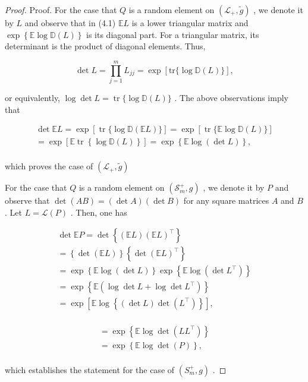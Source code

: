 \documentclass[11pt]{article}
\begin{document}
\begin{proof}
Proof. For the case that  $Q$  is a random element on  $(\mathcal{L}_{+},\tilde{g})$ , we denote it by  $L$  and observe that in (4.1)  $\mathbb{E}L$  is a lower triangular matrix and  $\exp \left\{\mathbb{E}\log \mathbb{D}(L)\right\}$  is its diagonal part. For a triangular matrix, its determinant is the product of diagonal elements. Thus,

$$
\det L = \prod_ {j = 1} ^ {m} L _ {j j} = \exp [ \mathrm {t r} \{\log \mathbb {D} (L) \} ],
$$

or equivalently,  $\log \det L = \operatorname{tr}\{\log \mathbb{D}(L)\}$ . The above observations imply that

$$
\begin{array}{l} \det  \mathbb {E} L = \exp [ \operatorname {t r} \{\log \mathbb {D} (\mathbb {E} L) \} ] = \exp [ \operatorname {t r} \{\mathbb {E} \log \mathbb {D} (L) \} ] \\ = \exp \left[ \mathbb {E} \operatorname {t r} \left\{\log \mathbb {D} (L) \right\} \right] = \exp \left\{\mathbb {E} \log (\det  L) \right\}, \\ \end{array}
$$

which proves the case of  $(\mathcal{L}_{+},\tilde{g})$

For the case that  $Q$  is a random element on  $(\mathcal{S}_m^+, g)$ , we denote it by  $P$  and observe that  $\operatorname{det}(AB) = (\operatorname{det} A)(\operatorname{det} B)$  for any square matrices  $A$  and  $B$ . Let  $L = \mathcal{L}(P)$ . Then, one has

$$
\begin{array}{l} \det  \mathbb {E} P = \det  \left\{\left(\mathbb {E} L\right) \left(\mathbb {E} L\right) ^ {\top} \right\} \\ = \left\{\det  (\mathbb {E} L) \right\} \left\{\det  (\mathbb {E} L) ^ {\top} \right\} \\ = \exp \left\{\mathbb {E} \log (\det  L) \right\} \exp \left\{\mathbb {E} \log (\det  L ^ {\top}) \right\} \\ = \exp \left\{\mathbb {E} \left(\log \det  L + \log \det  L ^ {\top}\right) \right\} \\ = \exp \left[ \mathbb {E} \log \left\{\left(\det  L\right) \det  \left(L ^ {\top}\right) \right\} \right], \\ \end{array}
$$

$$
\begin{array}{l} = \exp \left\{\mathbb {E} \log \det  (L L ^ {\top}) \right\} \\ = \exp \left\{\mathbb {E} \log \det  (P) \right\}, \\ \end{array}
$$

which establishes the statement for the case of  $(S_m^+, g)$ .

\end{proof}
\end{document}
